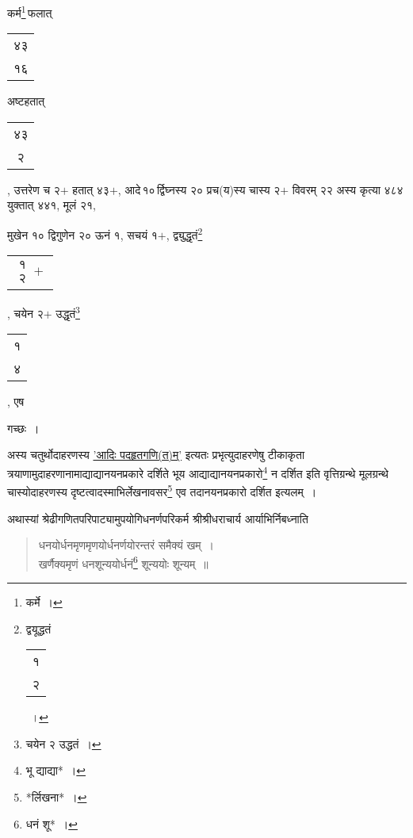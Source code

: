 \documentclass[10pt, openany]{book}
\begin{document}
{{{{{{ 
\vspace{3mm}

{कर्म\renewcommand{\thefootnote}{७}\footnote{कर्मे~।}\textendash \,फलात् \begin{tabular}{|c|}४३\\ १६\end{tabular}  अष्टहतात् \begin{tabular}{|c|} ४३ \\२\end{tabular} , उत्तरेण च २$+$ हतात्
४३$+$, आदे\textendash \,१०\textendash \,र्द्विघ्नस्य २० प्रच(य)स्य चास्य २$+$ विवरम् २२ अस्य कृत्या ४८४ युक्तात्
४४१, मूलं २१,}
{मुखेन १० द्विगुणेन २० ऊनं १, सचयं १$+$, द्व्युद्धृतं\renewcommand{\thefootnote}{८}\footnote{द्वयूद्धतं\begin{tabular}{|c|} १\\ २\end{tabular}~।} \begin{tabular}{|c|}$\begin{matrix}
\mbox{{१}}\\
\mbox{{२}}
\end{matrix}+$\end{tabular} , चयेन २$+$
उद्धृतं\renewcommand{\thefootnote}{९}\footnote{चयेन २ उद्धतं~।} \begin{tabular}{|c|} १\\ ४\end{tabular} , एष}
{गच्छः~।}
\vspace{3mm}

{अस्य चतुर्थोदाहरणस्य \hyperref[86.1]{'आदिः पदहृतगणि(त)म्'} इत्यतः प्रभृत्युदाहरणेषु टीकाकृता त्रयाणामुदाहरणानामाद्याद्यानयनप्रकारे दर्शिते भूय
आद्याद्यानयनप्रकारो\renewcommand{\thefootnote}{१०}\footnote{भू
द्याद्या*~।} न दर्शित इति}
{वृत्तिग्रन्थे मूलग्रन्थे चास्योदाहरणस्य
दृष्टत्वादस्माभिर्लेखनावसर\renewcommand{\thefootnote}{११}\footnote{*र्लिखना*~।} एव तदानयनप्रकारो दर्शित इत्यलम्~।}
\vspace{3mm}

{अथास्यां श्रेढीगणितपरिपाट्यामुपयोगिधनर्णपरिकर्म श्रीश्रीधराचार्य
आर्याभिर्निबध्नाति\textendash }

\begin{quote}
    
 {\qt धनयोर्धनमृणमृणयोर्धनर्णयोरन्तरं समैक्यं खम्~।\\
 खर्णैक्यमृणं धनशून्ययोर्धनं\renewcommand{\thefootnote}{१२}\footnote{धनं शू*~।}  शून्ययोः शून्यम्~॥}\end{quote}

}}}}}}
\end{document}
